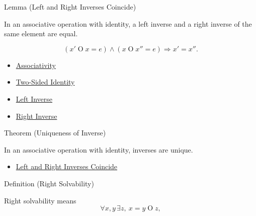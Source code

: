 \begin{lemmabox}{Lemma (Left and Right Inverses Coincide)}
\begin{lemma}
\label{lem:left-right-inverses-coincide}
In an associative operation with identity, a left inverse and a right inverse
of the same element are equal.
\end{lemma}
\end{lemmabox}

\begin{remark*}
\[
(x'\mathbin{O}x=e)\land(x\mathbin{O}x''=e)
\Longrightarrow x'=x''.
\]
\end{remark*}

\begin{dependencies}
\begin{itemize}
  \item \hyperref[def:associativity]{Associativity}
  \item \hyperref[def:two-sided-identity]{Two-Sided Identity}
  \item \hyperref[def:left-inverse]{Left Inverse}
  \item \hyperref[def:right-inverse]{Right Inverse}
\end{itemize}
\end{dependencies}

\begin{theorembox}{Theorem (Uniqueness of Inverse)}
\begin{theorem}
\label{thm:uniqueness-of-inverse}
In an associative operation with identity, inverses are unique.
\end{theorem}
\end{theorembox}

\begin{dependencies}
\begin{itemize}
  \item \hyperref[lem:left-right-inverses-coincide]{Left and Right Inverses Coincide}
\end{itemize}
\end{dependencies}

\begin{definitionbox}{Definition (Right Solvability)}
\begin{definition}
\label{def:right-solvability}
Right solvability means
\[
\forall x,y\,\exists z,\ x=y\mathbin{O}z,
\]
\end{definition}
\end{definitionbox}

